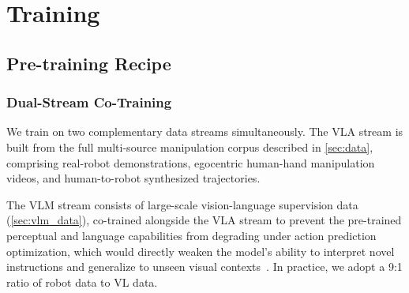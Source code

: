 \section{Training}
\label{sec:training}
\subsection{Pre-training Recipe}

\subsubsection{Dual-Stream Co-Training}
We train \ours on two complementary data streams simultaneously. The VLA stream is built from the full multi-source manipulation corpus described in \cref{sec:data}, comprising real-robot demonstrations, egocentric human-hand manipulation videos, and human-to-robot synthesized trajectories. 

The VLM stream consists of large-scale vision-language supervision data (\cref{sec:vlm_data}), co-trained alongside the VLA stream to prevent the pre-trained perceptual and language capabilities from degrading under action prediction optimization, which would directly weaken the model's ability to interpret novel instructions and generalize to unseen visual contexts~\citep{driess2025knowledge}. In practice, we adopt a 9:1 ratio of robot data to VL data.




